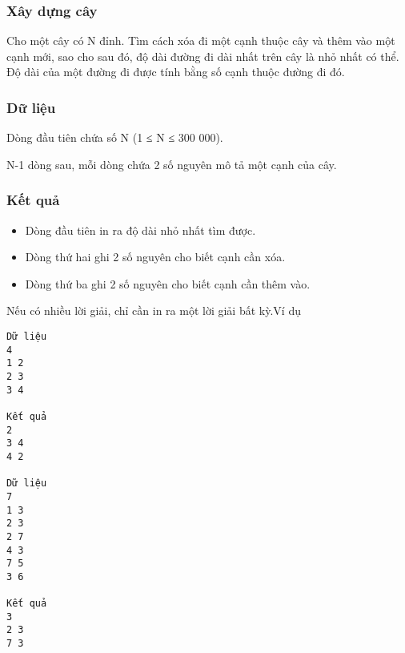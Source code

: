 



\subsubsection{   Xây dựng cây  }

   Cho một cây có N đỉnh. Tìm cách xóa đi một cạnh thuộc   cây và thêm vào một cạnh mới, sao cho sau đó, độ dài đường   đi dài nhất trên cây là nhỏ nhất có thể. Độ dài của một đường   đi được tính bằng số cạnh thuộc đường đi đó.  

\subsubsection{   Dữ liệu  }

   Dòng đầu tiên chứa số N (1 ≤ N ≤ 300 000).  

   N-1 dòng sau, mỗi dòng chứa 2 số nguyên mô tả một cạnh   của cây.  

\subsubsection{   Kết quả  }
\begin{itemize}
	\item     Dòng đầu tiên in ra độ dài nhỏ nhất tìm được.   
	\item     Dòng thứ hai ghi 2 số nguyên cho biết cạnh cần xóa.   
	\item     Dòng thứ ba ghi 2 số nguyên cho biết cạnh cần thêm   vào.   
\end{itemize}

   Nếu có nhiều lời giải, chỉ cần in ra một lời giải bất kỳ.Ví dụ  
\begin{verbatim}
Dữ liệu
4
1 2
2 3
3 4

Kết quả
2
3 4
4 2

Dữ liệu
7
1 3
2 3
2 7
4 3
7 5
3 6

Kết quả
3
2 3
7 3
\end{verbatim}